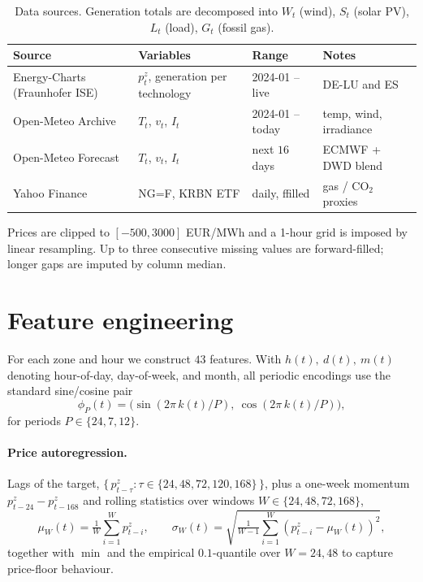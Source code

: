 \documentclass[11pt,a4paper]{article}
\begin{document}
\begin{table}[h]
\centering
\small
\begin{tabular}{@{}llll@{}}
\toprule
Source & Variables & Range & Notes \\ \midrule
Energy-Charts (Fraunhofer ISE) &
  $p_t^z$, generation per technology & 2024-01 -- live & DE-LU and ES \\
Open-Meteo Archive &
  $T_t$, $v_t$, $I_t$ & 2024-01 -- today & temp, wind, irradiance \\
Open-Meteo Forecast &
  $T_t$, $v_t$, $I_t$ & next $16$ days & ECMWF + DWD blend \\
Yahoo Finance &
  NG=F, KRBN ETF & daily, ffilled & gas / CO$_2$ proxies \\ \bottomrule
\end{tabular}
\caption{Data sources. Generation totals are decomposed into
$W_t$ (wind), $S_t$ (solar PV), $L_t$ (load), $G_t$ (fossil gas).}
\end{table}

Prices are clipped to $[-500, 3000]$ EUR/MWh and a 1-hour grid is
imposed by linear resampling. Up to three consecutive missing values
are forward-filled; longer gaps are imputed by column median.

\section{Feature engineering}
\label{sec:features}

For each zone and hour we construct $43$ features. With
$h(t),\ d(t),\ m(t)$ denoting hour-of-day, day-of-week, and month, all
periodic encodings use the standard sine/cosine pair
\begin{equation}
  \phi_P(t) = \bigl(\sin(2\pi\,k(t)/P),\ \cos(2\pi\,k(t)/P)\bigr),
\end{equation}
for periods $P \in \{24, 7, 12\}$.

\paragraph{Price autoregression.}
Lags of the target,
$\bigl\{\,p_{t-\tau}^z : \tau \in \{24, 48, 72, 120, 168\}\,\bigr\}$,
plus a one-week momentum $p_{t-24}^z - p_{t-168}^z$ and rolling
statistics over windows $W \in \{24, 48, 72, 168\}$,
\begin{equation}
  \mu_W(t) = \tfrac{1}{W}\!\!\sum_{i=1}^{W} p_{t-i}^z,
  \qquad
  \sigma_W(t) = \sqrt{\tfrac{1}{W-1}\!\!\sum_{i=1}^{W}(p_{t-i}^z - \mu_W(t))^2},
\end{equation}
together with $\min$ and the empirical $0.1$-quantile over $W=24,48$ to
capture price-floor behaviour.
\end{document}
